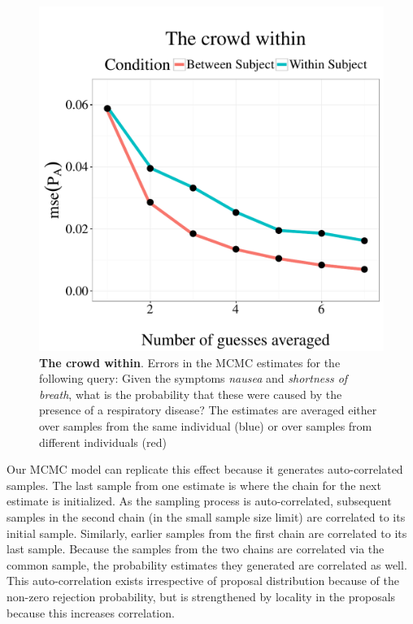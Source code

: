 \begin{figure}
\centering
\includegraphics[scale = 0.5]{figures/error.pdf}
\caption{\textbf{The crowd within}. Errors in the MCMC estimates for the following query: Given the symptoms \emph{nausea} and \emph{shortness of breath}, what is the probability that these were caused by the presence of a respiratory disease? The estimates are averaged either over samples from the same individual (blue) or over samples from different individuals (red)}
\label{fig:asymptote}
\end{figure}

Our MCMC model can replicate this effect because it generates auto-correlated samples. The last sample from one estimate is where the chain for the next estimate is initialized. As the sampling process is auto-correlated, subsequent samples in the second chain (in the small sample size limit) are correlated to its initial sample. Similarly, earlier samples from the first chain are correlated to its last sample. Because the samples from the two chains are correlated via the common sample, the probability estimates they generated are correlated as well. This auto-correlation exists irrespective of proposal distribution because of the non-zero rejection probability, but is strengthened by locality in the proposals because this increases correlation.

